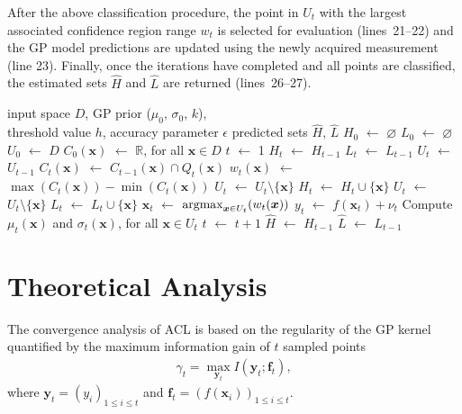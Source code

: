 \documentclass{article}
\def\*#1{\bm{#1}}
\newcommand*\LET[2]{\STATE #1 $\gets$ #2}
\newcommand{\argmax}{\operatornamewithlimits{argmax}}
\newcommand{\acl}{\textsf{ACL}\xspace}
\begin{document}
After the above classification procedure, the point in $U_t$
with the largest associated confidence region range $w_t$ is selected for
evaluation (lines~21--22) and the GP model predictions are updated using the
newly acquired measurement (line 23). Finally, once the iterations have
completed and all points are classified, the estimated sets $\hat{H}$ and
$\hat{L}$ are returned  (lines~26--27).

\begin{algorithm}[tb]
  \caption{The \acl algorithm}
  \label{alg:acl}
\begin{algorithmic}[1]
  \REQUIRE input space $D$, GP prior ($\mu_0$, $\sigma_0$, $k$),\\
           \hspace{1.9em}threshold value $h$, accuracy parameter $\epsilon$
  \ENSURE predicted sets $\hat{H}$, $\hat{L}$
  \LET{$H_0$}{$\varnothing$}
  \LET{$L_0$}{$\varnothing$}
  \LET{$U_0$}{$D$}
  \LET{$C_0(\*x)$}{$\mathbb{R}$, for all $\*x \in D$}
  \LET{$t$}{1}
    \LET{$H_t$}{$H_{t-1}$}
    \LET{$L_t$}{$L_{t-1}$}
    \LET{$U_t$}{$U_{t-1}$}
    \FORALL{$\*x \in U_{t-1}$}
      \LET{$C_{t}(\*x)$}{$C_{t-1}(\*x) \cap Q_t(\*x)$}
      \LET{$w_{t}(\*x)$}{$\max(C_{t}(\*x)) - \min(C_{t}(\*x))$}
      \IF{$\min(C_t(\*x)) + \epsilon \geq h$}
        \LET{$U_t$}{$U_t \setminus \{\*x\}$}
        \LET{$H_t$}{$H_t \cup \{\*x\}$}
      \ELSIF{$\max(C_t(\*x)) - \epsilon \leq h$}
        \LET{$U_t$}{$U_t \setminus \{\*x\}$}
        \LET{$L_t$}{$L_t \cup \{\*x\}$}
      \ENDIF
    \ENDFOR
    \LET{$\*x_t$}{$\argmax_{\*x \in U_t}(w_t(\*x))$}
    \LET{$y_t$}{$f(\*x_t) + \nu_t$}
    \STATE Compute $\mu_t(\*x)$ and $\sigma_t(\*x)$, for all $\*x \in U_t$
    \LET{$t$}{$t + 1$}
  \ENDWHILE
  \LET{$\hat{H}$}{$H_{t-1}$}
  \LET{$\hat{L}$}{$L_{t-1}$}
\end{algorithmic}
\end{algorithm}

\section{Theoretical Analysis}
The convergence analysis of \acl is based on the regularity of the GP kernel
quantified by the maximum information gain of $t$ sampled points
\begin{align*}
\gamma_t = \max_{\*y_t}I(\*y_t; \*f_t),
\end{align*}
where $\*y_t = (y_i)_{1\leq i\leq t}$ and
$\*f_t = (f(\*x_i))_{1\leq i\leq t}$.
\end{document}
